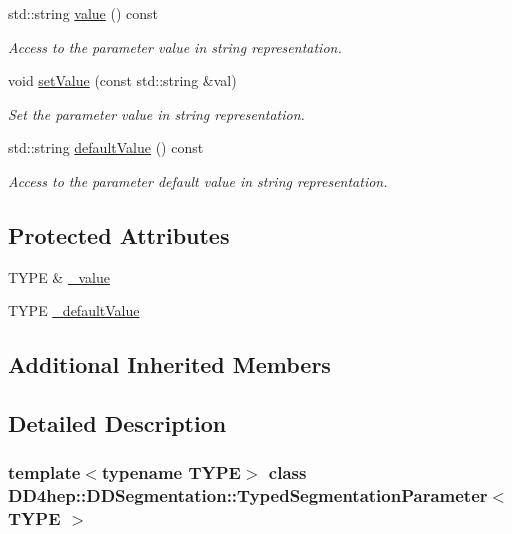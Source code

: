 \begin{DoxyCompactItemize}
std\+::string \hyperlink{class_d_d4hep_1_1_d_d_segmentation_1_1_typed_segmentation_parameter_a07802b94c9a0fe56051a70d455d0dd9f}{value} () const
\begin{DoxyCompactList}\small\item\em Access to the parameter value in string representation. \end{DoxyCompactList}\item 
void \hyperlink{class_d_d4hep_1_1_d_d_segmentation_1_1_typed_segmentation_parameter_a32e4b30c056572c1892b0607d05774e2}{set\+Value} (const std\+::string \&val)
\begin{DoxyCompactList}\small\item\em Set the parameter value in string representation. \end{DoxyCompactList}\item 
std\+::string \hyperlink{class_d_d4hep_1_1_d_d_segmentation_1_1_typed_segmentation_parameter_a56ed62bf9808b631e25a76e79ff8a686}{default\+Value} () const
\begin{DoxyCompactList}\small\item\em Access to the parameter default value in string representation. \end{DoxyCompactList}\end{DoxyCompactItemize}
\subsection*{Protected Attributes}
\begin{DoxyCompactItemize}
\item 
T\+Y\+PE \& \hyperlink{class_d_d4hep_1_1_d_d_segmentation_1_1_typed_segmentation_parameter_af22eb54e9ee1571cf874c2c05c641603}{\+\_\+value}
\item 
T\+Y\+PE \hyperlink{class_d_d4hep_1_1_d_d_segmentation_1_1_typed_segmentation_parameter_a91a6da96caf97f4c01828b98812d3e7f}{\+\_\+default\+Value}
\end{DoxyCompactItemize}
\subsection*{Additional Inherited Members}


\subsection{Detailed Description}
\subsubsection*{template$<$typename T\+Y\+PE$>$\newline
class D\+D4hep\+::\+D\+D\+Segmentation\+::\+Typed\+Segmentation\+Parameter$<$ T\+Y\+P\+E $>$}



